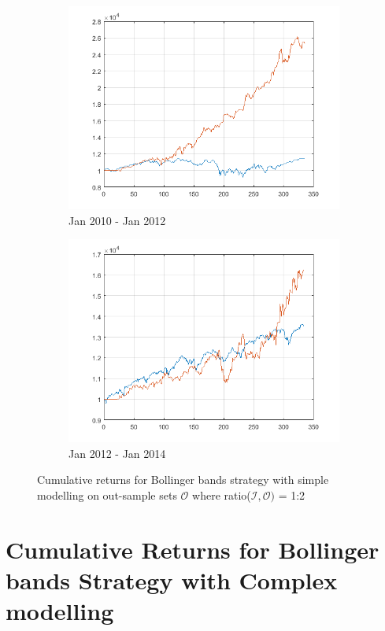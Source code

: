 \documentclass[11pt,a4,twosided,singlespacing,titlepagenumber=on]{scrreprt}
\numberwithin{equation}{chapter} %
\theoremstyle{remark}
\begin{document}
\begin{figure}[H]
\begin{subfigure}[t]{0.32\textwidth}
        \includegraphics[width=1\textwidth]{res/backtest/11}
        \caption{Jan 2010 - Jan 2012}
    \end{subfigure}
    \begin{subfigure}[t]{0.32\textwidth}
        \centering
        \includegraphics[width=1\textwidth]{res/backtest/12}
        \caption{Jan 2012 - Jan 2014}
    \end{subfigure}
    \caption{Cumulative returns for Bollinger bands strategy with simple modelling on out-sample sets $\mathcal{O}$ where ratio($\mathcal{I}, \mathcal{O})$ = 1:2}
    \label{fig:bollinger_bands_strategy_simple}
\end{figure}

\section{Cumulative Returns for Bollinger bands Strategy with Complex modelling}
\label{app:portfolio_valuation_complex}
\end{document}
